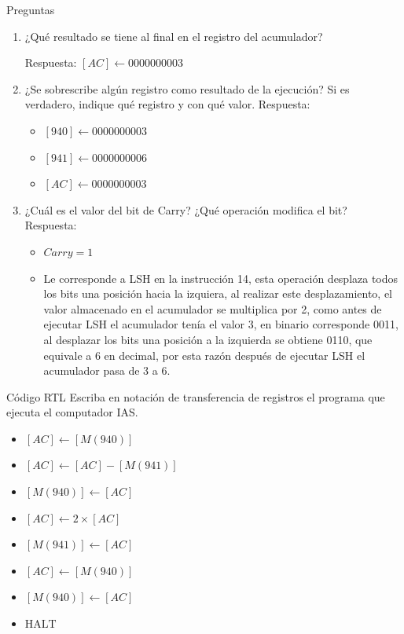 \documentclass{article}
\begin{document}
\begin{frame}[label={sec:orga20f46b}]{Preguntas}
\begin{enumerate}
\item ¿Qué resultado se tiene al final en el registro del acumulador?

Respuesta:
\([AC] \leftarrow 0000000003\)

\item ¿Se sobrescribe algún registro como resultado de la ejecución? Si
es verdadero, indique qué registro y con qué valor.
Respuesta:
\begin{itemize}
\item \([940] \leftarrow 0000000003\)
\item \([941] \leftarrow 0000000006\)
\item \([AC] \leftarrow 0000000003\)
\end{itemize}

\item ¿Cuál es el valor del bit de Carry? ¿Qué operación modifica el bit?
Respuesta:
\begin{itemize}
\item \(Carry = 1\)

\item Le corresponde a LSH en la instrucción 14, esta operación desplaza todos los bits una posición
hacia la izquiera, al realizar este desplazamiento, el valor almacenado en el acumulador se
multiplica por 2, como antes de ejecutar LSH el acumulador tenía el valor 3, en binario corresponde
0011, al desplazar los bits una posición a la izquierda se obtiene 0110, que equivale a 6 en decimal,
por esta razón después de ejecutar LSH el acumulador pasa de 3 a 6.
\end{itemize}
\end{enumerate}
\end{frame}

\begin{frame}[label={sec:orgf16b01e}]{Código RTL}
Escriba en notación de transferencia de registros el programa que
ejecuta el computador IAS.

\begin{itemize}
\item \([AC] \leftarrow [M(940)]\)
\item \([AC] \leftarrow [AC] - [M(941)]\)
\item \([M(940)] \leftarrow [AC]\)
\item \([AC] \leftarrow 2 \times [AC]\)
\item \([M(941)] \leftarrow [AC]\)
\item \([AC] \leftarrow [M(940)]\)
\item \([M(940)] \leftarrow [AC]\)
\item \(\text{HALT}\)
\end{itemize}
\end{frame}
\end{document}
